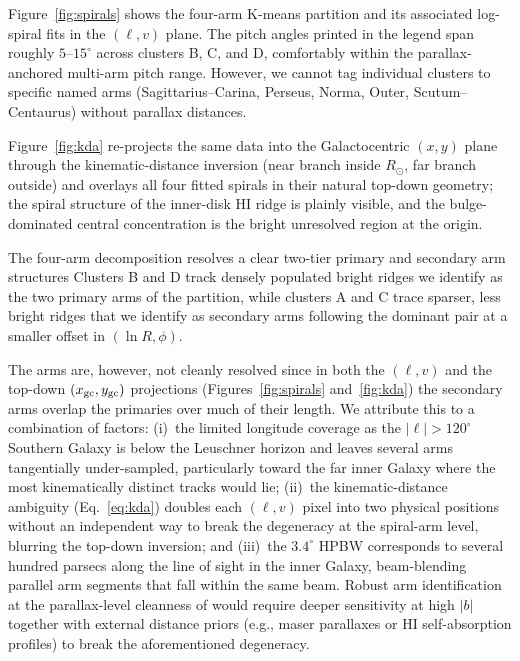 \documentclass[10pt,preprint2]{aastex}
\begin{document}
Figure~\ref{fig:spirals} shows the four-arm K-means partition and its associated log-spiral fits in the $(\ell, v)$ plane. The pitch angles printed in the legend span roughly $5$--$15^\circ$ across clusters B, C, and D, comfortably within the parallax-anchored \citet{Reid2014} multi-arm pitch range. However, we cannot tag individual clusters to specific named arms (Sagittarius--Carina, Perseus, Norma, Outer, Scutum--Centaurus) without parallax distances. 

Figure~\ref{fig:kda} re-projects the same data into the Galactocentric $(x, y)$ plane through the kinematic-distance inversion (near branch inside $R_\odot$, far branch outside) and overlays all four fitted spirals in their natural top-down geometry; the spiral structure of the inner-disk HI ridge is plainly visible, and the bulge-dominated central concentration is the bright unresolved region at the origin.

The four-arm decomposition resolves a clear two-tier primary and secondary arm structures Clusters B and D track densely populated bright ridges we identify as the two primary arms of the partition, while clusters A and C trace sparser, less bright ridges that we identify as secondary arms following the dominant pair at a smaller offset in $(\ln R, \phi)$. 

The arms are, however, not cleanly resolved since in both the $(\ell, v)$ and the top-down $(x_{\rm gc}, y_{\rm gc})$ projections (Figures~\ref{fig:spirals} and~\ref{fig:kda}) the secondary arms overlap the primaries over much of their length. We attribute this to a combination of factors: (i)~the limited longitude coverage as the $|\ell|>120^\circ$ Southern Galaxy is below the Leuschner horizon and leaves several arms tangentially under-sampled, particularly toward the far inner Galaxy where the most kinematically distinct tracks would lie; (ii)~the kinematic-distance ambiguity (Eq.~\eqref{eq:kda}) doubles each $(\ell, v)$ pixel into two physical positions without an independent way to break the degeneracy at the spiral-arm level, blurring the top-down inversion; and (iii)~the $3.4^\circ$ HPBW corresponds to several hundred parsecs along the line of sight in the inner Galaxy, beam-blending parallel arm segments that fall within the same beam. Robust arm identification at the parallax-level cleanness of \citet{Reid2014} would require deeper sensitivity at high $|b|$ together with external distance priors (e.g., maser parallaxes or HI self-absorption profiles) to break the aforementioned degeneracy.
\end{document}
